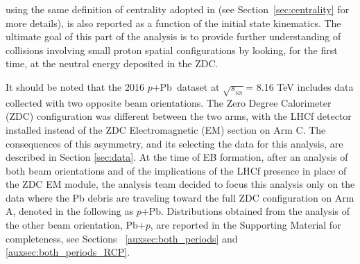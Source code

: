 \documentclass[NOTE, atlasdraft=true, texlive=2020, UKenglish]{atlasdoc}
\newcommand{\SNN}{\ensuremath{\sqrt{s_{_\text{NN}}}}}
\newcommand{\pxPb}{$p$+Pb}
\newcommand{\Pbxp}{Pb+$p$}
\begin{document}
using the same definition of centrality adopted in \cite{ATLAS:2023zfx} (see Section~\ref{sec:centrality} for more details), is also reported as a function of the initial state kinematics. The ultimate goal of this part of the analysis is to provide further understanding of collisions involving small proton spatial configurations by looking, for the first time, at the neutral energy deposited in the ZDC. 

It should be noted that the 2016 \pxPb\ dataset at \SNN = 8.16 TeV includes data collected with two opposite beam orientations. The Zero Degree Calorimeter (ZDC) configuration was different between the two arms, with the LHCf detector installed instead of the ZDC Electromagnetic (EM) section on Arm C. The consequences of this asymmetry, and its selecting the data for this analysis, are described in Section \ref{sec:data}. At the time of EB formation, after an analysis of both beam orientations and of the implications of the LHCf presence in place of the ZDC EM module, the analysis team decided to focus this analysis only on the data where the Pb debris are traveling toward the full ZDC configuration on Arm A, denoted in the following as \pxPb. Distributions obtained from the analysis of the other beam orientation, \Pbxp, are reported in the Supporting Material for completeness, see Sections ~\ref{auxsec:both_periods} and \ref{auxsec:both_periods_RCP}. 


\newpage
\end{document}

